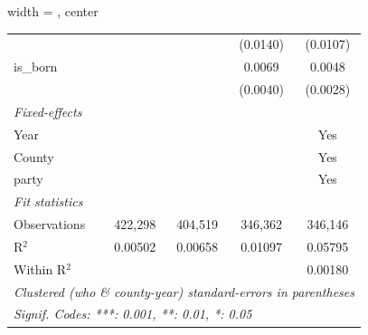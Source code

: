 \begin{adjustbox}{width = \textwidth, center}
\begin{tabular}{lcccc}
                                                            &                &                & (0.0140)       & (0.0107)\\   
      is\_born                                              &                &                & 0.0069         & 0.0048\\   
                                                            &                &                & (0.0040)       & (0.0028)\\   
      \midrule
      \emph{Fixed-effects}\\
      Year                                                  &                &                &                & Yes\\  
      County                                                &                &                &                & Yes\\  
      party                                                 &                &                &                & Yes\\  
      \midrule
      \emph{Fit statistics}\\
      Observations                                          & 422,298        & 404,519        & 346,362        & 346,146\\  
      R$^2$                                                 & 0.00502        & 0.00658        & 0.01097        & 0.05795\\  
      Within R$^2$                                          &                &                &                & 0.00180\\  
      \midrule \midrule
      \multicolumn{5}{l}{\emph{Clustered (who \& county-year) standard-errors in parentheses}}\\
      \multicolumn{5}{l}{\emph{Signif. Codes: ***: 0.001, **: 0.01, *: 0.05}}\\
   \end{tabular}
\end{adjustbox}
\par\endgroup



